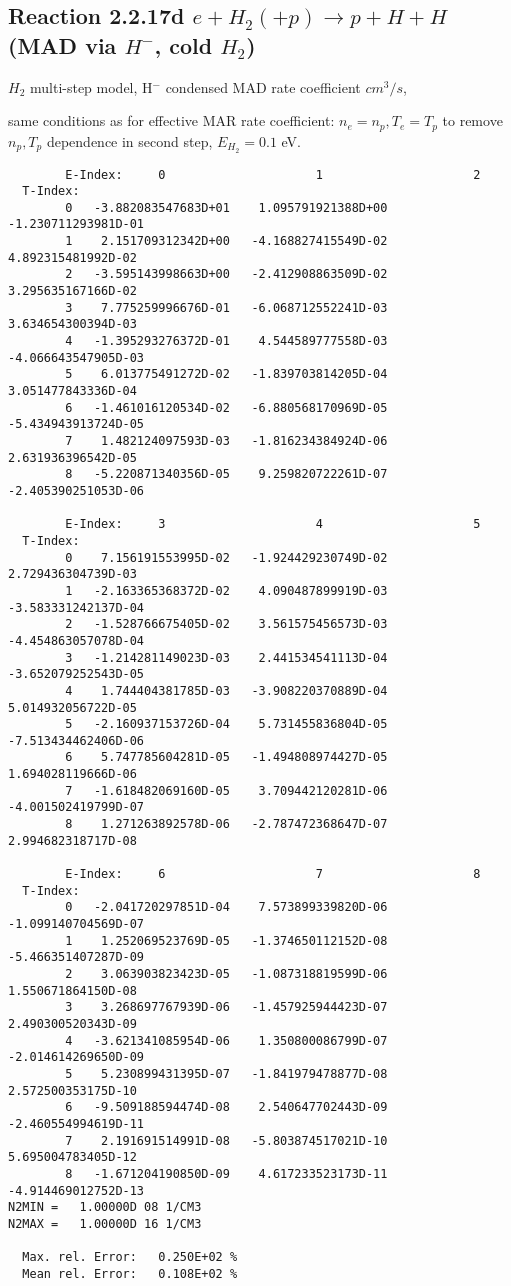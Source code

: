 \documentclass[12pt,dvipdfmx]{article}
\begin{document}
\subsection{
Reaction 2.2.17d   $e + H_2 (+p)   \rightarrow p + H + H  $ (MAD via $H^-$, cold $H_2$)
}

$H_2$ multi-step model, H$^-$ condensed MAD rate coefficient $cm^3/s$,

same conditions as for effective MAR rate coefficient: $n_e=n_p, T_e=T_p$ to remove $n_p,T_p$ dependence in second step,  $E_{H_2}=0.1$ eV.

\begin{small}\begin{verbatim}
        E-Index:     0                     1                     2
  T-Index:
        0   -3.882083547683D+01    1.095791921388D+00   -1.230711293981D-01
        1    2.151709312342D+00   -4.168827415549D-02    4.892315481992D-02
        2   -3.595143998663D+00   -2.412908863509D-02    3.295635167166D-02
        3    7.775259996676D-01   -6.068712552241D-03    3.634654300394D-03
        4   -1.395293276372D-01    4.544589777558D-03   -4.066643547905D-03
        5    6.013775491272D-02   -1.839703814205D-04    3.051477843336D-04
        6   -1.461016120534D-02   -6.880568170969D-05   -5.434943913724D-05
        7    1.482124097593D-03   -1.816234384924D-06    2.631936396542D-05
        8   -5.220871340356D-05    9.259820722261D-07   -2.405390251053D-06

        E-Index:     3                     4                     5
  T-Index:
        0    7.156191553995D-02   -1.924429230749D-02    2.729436304739D-03
        1   -2.163365368372D-02    4.090487899919D-03   -3.583331242137D-04
        2   -1.528766675405D-02    3.561575456573D-03   -4.454863057078D-04
        3   -1.214281149023D-03    2.441534541113D-04   -3.652079252543D-05
        4    1.744404381785D-03   -3.908220370889D-04    5.014932056722D-05
        5   -2.160937153726D-04    5.731455836804D-05   -7.513434462406D-06
        6    5.747785604281D-05   -1.494808974427D-05    1.694028119666D-06
        7   -1.618482069160D-05    3.709442120281D-06   -4.001502419799D-07
        8    1.271263892578D-06   -2.787472368647D-07    2.994682318717D-08

        E-Index:     6                     7                     8
  T-Index:
        0   -2.041720297851D-04    7.573899339820D-06   -1.099140704569D-07
        1    1.252069523769D-05   -1.374650112152D-08   -5.466351407287D-09
        2    3.063903823423D-05   -1.087318819599D-06    1.550671864150D-08
        3    3.268697767939D-06   -1.457925944423D-07    2.490300520343D-09
        4   -3.621341085954D-06    1.350800086799D-07   -2.014614269650D-09
        5    5.230899431395D-07   -1.841979478877D-08    2.572500353175D-10
        6   -9.509188594474D-08    2.540647702443D-09   -2.460554994619D-11
        7    2.191691514991D-08   -5.803874517021D-10    5.695004783405D-12
        8   -1.671204190850D-09    4.617233523173D-11   -4.914469012752D-13
N2MIN =   1.00000D 08 1/CM3
N2MAX =   1.00000D 16 1/CM3

  Max. rel. Error:   0.250E+02 %
  Mean rel. Error:   0.108E+02 %

\end{verbatim}\end{small}
\end{document}
